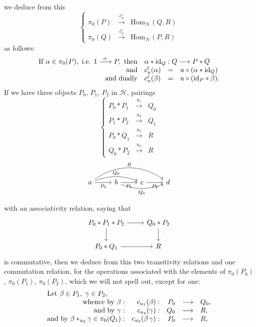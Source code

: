 \documentclass[11pt]{article}
\newcommand{\printedpage}[1]{\marginpar{\footnotesize p.~#1}}
\newcommand{\msp}[1]{\marginpar{\footnotesize [#1]}}
\begin{document}
\printedpage{4}

we deduce from this
\[
\left\{
\begin{array}{lcl}
\pi_0(P) & \xrightarrow{c_u^{\mathrm{l}}} & \mathrm{Hom}_{\mathcal{H}}(Q,R)\\
\pi_0(Q) & \xrightarrow{c_u^{\mathrm{r}}} & \mathrm{Hom}_{\mathcal{H}}(P,R)
\end{array}
\right.
\]
as follows:
\[
\begin{array}{rlcl}
\text{If } \alpha\in\pi_0(P),\ \text{i.e. } 1\xrightarrow{\ \alpha\ }P,\ \text{then} & \multicolumn{3}{l}{\alpha*\mathrm{id}_Q : Q\longrightarrow P*Q}\\
\text{and} & c^{\mathrm{l}}_u(\alpha) & = & u\circ(\alpha*\mathrm{id}_Q)\\
\text{and dually} & c^{\mathrm{r}}_u(\beta) & = & u\circ(\mathrm{id}_P*\beta).
\end{array}
\]
If we have three objects $P_0$, $P_1$, $P_2$ in $\mathcal{H}$, pairings
\[
\left\{
\begin{array}{rcl}
P_0*P_1 & \xrightarrow{u_1} & Q_0\\
P_1*P_2 & \xrightarrow{u_2} & Q_1\\
P_0*Q_1 & \xrightarrow{u_3} & R\\
Q_0*P_2 & \xrightarrow{u_4} & R
\end{array}
\right.
\]
\[
\begin{tikzcd}
a \arrow[r, "P_0"'] \arrow[rr, bend left=20, "Q_0"] \arrow[rrr, bend left=35, "R"] & b \arrow[r, "P_1"'] \arrow[rr, bend right=20, "Q_1"'] & c \arrow[r, "P_2"'] & d
\end{tikzcd}
\]

\msp{page 6}
with an associativity relation, saying that
\[
\begin{tikzcd}
P_0*P_1*P_2 \arrow[r] \arrow[d] & Q_0*P_2 \arrow[d]\\
P_0*Q_1 \arrow[r] & R
\end{tikzcd}
\]
is commutative, then we deduce from this two transitivity relations and one commutation relation, for the operations associated with the elements of $\pi_0(P_0)$, $\pi_0(P_1)$, $\pi_0(P_2)$, which we will not spell out, except for one:
\[
\begin{array}{rrrcl}
\multicolumn{5}{l}{\text{Let } \beta\in P_1,\ \gamma\in P_2,}\\
\text{whence by } \beta : & c_{u_1}(\beta) : & P_0 & \longrightarrow & Q_0,\\
\text{and by } \gamma : & c_{u_4}(\gamma) : & Q_0 & \longrightarrow & R,\\
\text{and by } \beta *_{u_2}\gamma\in\pi_0(Q_1) : & c_{u_3}(\beta\,\gamma) : & P_0 & \longrightarrow & R,
\end{array}
\]
\end{document}

